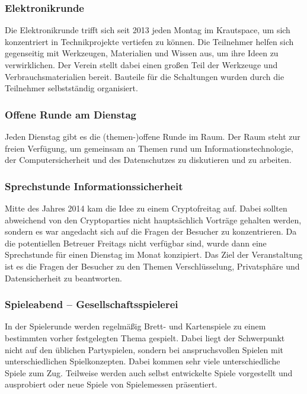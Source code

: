 \documentclass[ngerman]{scrartcl}
\begin{document}
\subsubsection{Elektronikrunde}

Die Elektronikrunde trifft sich seit 2013 jeden Montag im Krautspace, um
sich konzentriert in Technikprojekte vertiefen zu können. Die
Teilnehmer helfen sich gegenseitig mit Werkzeugen, Materialien und
Wissen aus, um ihre Ideen zu verwirklichen. Der Verein stellt dabei
einen großen Teil der Werkzeuge und Verbrauchsmaterialien bereit.
Bauteile für die Schaltungen wurden durch die Teilnehmer selbstständig
organisiert.

\subsubsection{Offene Runde am Dienstag}

Jeden Dienstag gibt es die (themen-)offene Runde im Raum. Der Raum
steht zur freien Verfügung, um gemeinsam an Themen rund um
Informationstechnologie, der Computersicherheit und des Datenschutzes
zu diskutieren und zu arbeiten.

\subsubsection{Sprechstunde Informationssicherheit}

Mitte des Jahres 2014 kam die Idee zu einem Cryptofreitag auf. Dabei
sollten abweichend von den Cryptoparties nicht hauptsächlich Vorträge
gehalten werden, sondern es war angedacht sich auf die Fragen der
Besucher zu konzentrieren.  Da die potentiellen Betreuer Freitags
nicht verfügbar sind, wurde dann eine Sprechstunde für einen Dienstag
im Monat konzipiert.  Das Ziel der Veranstaltung ist es die Fragen der
Besucher zu den Themen Verschlüsselung, Privatsphäre und
Datensicherheit zu beantworten.

\subsubsection{Spieleabend -- Gesellschaftsspielerei}

In der Spielerunde werden regelmäßig Brett- und Kartenspiele zu einem
bestimmten vorher festgelegten Thema gespielt. Dabei liegt der
Schwerpunkt nicht auf den üblichen Partyspielen, sondern bei
anspruchsvollen Spielen mit unterschiedlichen Spielkonzepten. Dabei
kommen sehr viele unterschiedliche Spiele zum Zug. Teilweise werden
auch selbst entwickelte Spiele vorgestellt und ausprobiert oder neue
Spiele von Spielemessen präsentiert.
\end{document}

